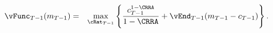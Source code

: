   \begin{eqnarray}
    {\vFunc}_{T-1}({m}_{T-1})  & = & \max_{\cRat_{T-1}}
                                     \left\{
                                     \frac{{c}_{T-1}^{1-\CRRA}}{1-\CRRA} +
                                     \vEnd_{T-1}({m}_{T-1}-{c}_{T-1})
                                     \right\}.
                                     \label{eq:vEndTm1}
  \end{eqnarray}
